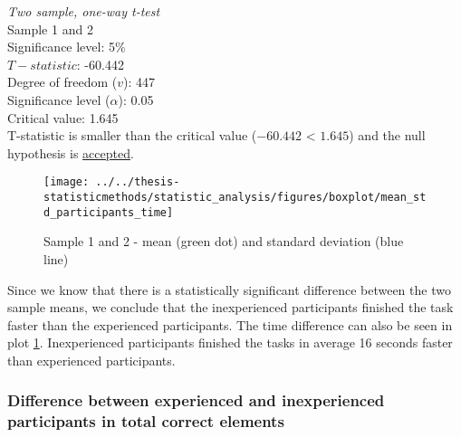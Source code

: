  \begin{center}
	\begin{tcolorbox}[width=0.8\textwidth]
		\centering
		\textit{Two sample, one-way t-test}\\
		Sample 1 and 2\\
		Significance level: 5\%  \\[0.5cm]
		
		$T-statistic$: -60.442 \\
		Degree of freedom ($v$): 447 \\ %
		Significance level ($\alpha$): 0.05 \\
		Critical value: 1.645\\[0.2cm]
		
		T-statistic is smaller than the critical value ($-60.442$ < $1.645$) and the null hypothesis is \underline{accepted}.\\[0.5cm]
	\end{tcolorbox} 
\end{center}

\begin{figure}[H]
	\centering
	\texttt{[image: ../../thesis-statisticmethods/statistic\_analysis/figures/boxplot/mean\_std\_participants\_time]}
	\caption{Sample 1 and 2 - mean (green dot) and standard deviation (blue line)}
	\label{fig:meanstdparticipantstime}
\end{figure}

Since we know that there is a statistically significant difference between the two sample means, we conclude that the inexperienced participants finished the task faster than the experienced participants. The time difference can also be seen in plot \ref{fig:meanstdparticipantstime}. Inexperienced participants finished the tasks in average 16 seconds faster than experienced participants.\newline

\subsubsection[Sample 3, 4]{Difference between experienced and inexperienced participants in total correct elements} %

